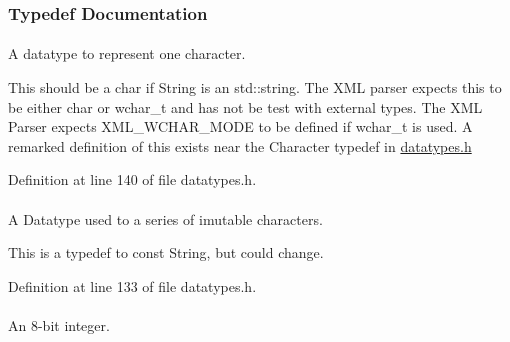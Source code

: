 \subsubsection{Typedef Documentation}
\hypertarget{namespaceMezzanine_ad5147a419db7627ee552a2b582f1052d}{
\paragraph[{Character}]{}\hfill}
\label{namespaceMezzanine_ad5147a419db7627ee552a2b582f1052d}


A datatype to represent one character. 

This should be a char if String is an std::string. The XML parser expects this to be either char or wchar\_\-t and has not be test with external types. The XML Parser expects XML\_\-WCHAR\_\-MODE to be defined if wchar\_\-t is used. A remarked definition of this exists near the Character typedef in \hyperlink{datatypes_8h_source}{datatypes.h} 

Definition at line 140 of file datatypes.h.

\hypertarget{namespaceMezzanine_a63cd699ac54b73953f35ec9cfc05e506}{
\paragraph[{ConstString}]{}\hfill}
\label{namespaceMezzanine_a63cd699ac54b73953f35ec9cfc05e506}


A Datatype used to a series of imutable characters. 

This is a typedef to const String, but could change. 

Definition at line 133 of file datatypes.h.

\hypertarget{namespaceMezzanine_acbb048ee99aa07566d5a6eb33f5a2c2d}{
\paragraph[{Int8}]{}\hfill}
\label{namespaceMezzanine_acbb048ee99aa07566d5a6eb33f5a2c2d}


An 8-\/bit integer. 

